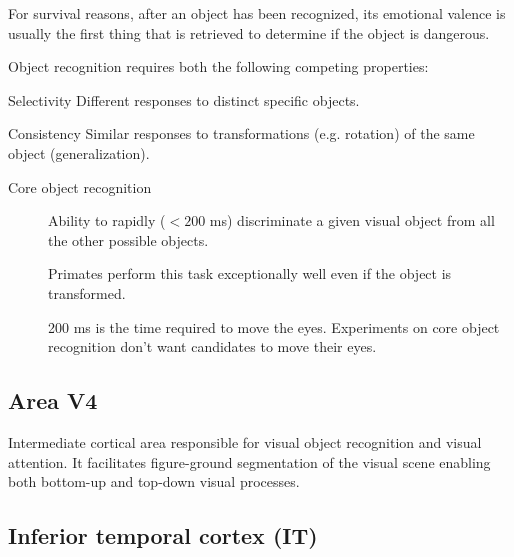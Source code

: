 \begin{remark}
    For survival reasons, after an object has been recognized, 
    its emotional valence is usually the first thing that is retrieved to determine if the object is dangerous.
\end{remark}


Object recognition requires both the following competing properties:
\begin{descriptionlist}
    \item[Selectivity] 
        Different responses to distinct specific objects.

    \item[Consistency] 
        Similar responses to transformations (e.g. rotation) of the same object (generalization).
\end{descriptionlist}

\begin{description}
    \item[Core object recognition] 
        Ability to rapidly ($< 200$ ms) discriminate a given visual object from all the other possible objects.
        \begin{remark}
            Primates perform this task exceptionally well even if the object is transformed.
        \end{remark}

        \begin{remark}
            200 ms is the time required to move the eyes. Experiments on core object recognition don't want candidates to move their eyes.
        \end{remark}
\end{description}


\subsection{Area V4}

Intermediate cortical area responsible for visual object recognition and visual attention.
It facilitates figure-ground segmentation of the visual scene enabling both bottom-up and top-down visual processes.


\subsection{Inferior temporal cortex (IT)}

